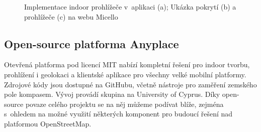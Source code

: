                       \begin{figure}
                    	  \centering
                    \hfill
                    \hfill

                    \caption{Implementace indoor prohlížeče v~aplikaci  (a); Ukázka pokrytí (b) a prohlížeče (c) na webu Micello\cite{zdroj23}}
                    \label{obr5}
                    \end{figure}
                    

\subsection{Open-source platforma Anyplace}\label{open-source-platforma-anyplace}

Otevřená platforma pod licencí MIT nabízí kompletní řešení pro indoor tvorbu, prohlížení i geolokaci a klientské aplikace pro všechny velké mobilní platformy.\cite{zdroj24} Zdrojové kódy jsou dostupné na GitHubu, včetně nástroje pro zaměření zemského pole kompasem. Vývoj provádí skupina na University of Cyprus. Díky open-source povaze celého projektu se na něj můžeme podívat blíže, zejména s~ohledem na možné využití některých komponent pro budoucí řešení nad platformou OpenStreetMap.


